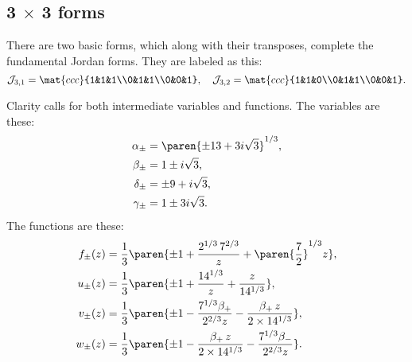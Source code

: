 \subsection{3 $\times$ 3 forms}
There are two basic forms, which along with their transposes, complete the fundamental Jordan forms. They are labeled as this:
\begin{equation}
 \mathcal{J}_{3,1}=\mat{ccc}{1&1&1\\0&1&1\\0&0&1}, \quad \mathcal{J}_{3,2}=\mat{ccc}{1&1&0\\0&1&1\\0&0&1}.
\end{equation}

Clarity calls for both intermediate variables and functions. The variables are these:
\begin{equation}
  \begin{split}
    \alpha_{\pm} &= \paren{\pm13 + 3i \sqrt{3}}^{1/3},\\
    \beta_{\pm}  &= 1 \pm i \sqrt{3},\\
    \delta_{\pm} &= \pm9 + i \sqrt{3},\\
    \gamma_{\pm} &= 1\pm3i\sqrt{3}.\\
  \end{split}
\end{equation}
The functions are these:
\begin{equation}
  \begin{split}
    f_{\pm}(z) &= \frac{1}{3}\paren{\pm1+\frac{2^{1/3}\,7^{2/3}}{z}+\paren{\frac{7}{2}}^{1/3}z},\\
    u_{\pm}(z)   &= \frac{1}{3}\paren{\pm1 + \frac{14^{1/3}}{z} + \frac{z}{14^{1/3}}},\\
    v_{\pm}(z)   &= \frac{1}{3}\paren{\pm1 - \frac{7^{1/3}\beta_{+}}{2^{2/3}z} - \frac{\beta_{+}\,z}{2\times14^{1/3}}},\\
    w_{\pm}(z) &= \frac{1}{3}\paren{\pm1 - \frac{\beta_{+}\, z}{2\times14^{1/3}} - \frac{7^{1/3}\beta_{-}}{2^{2/3}z}}.
  \end{split}
\end{equation}

